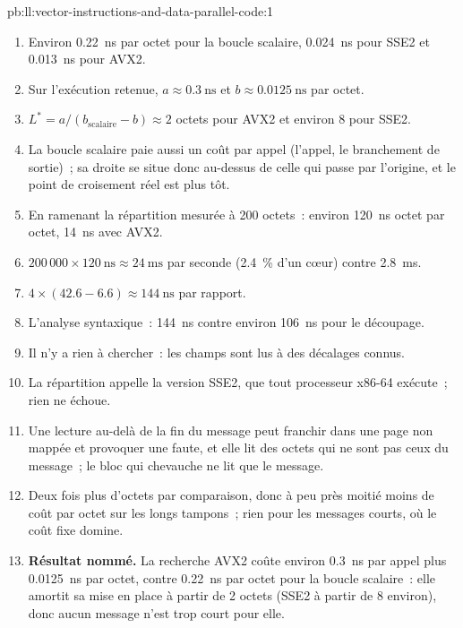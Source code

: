 \begin{solution}{pb:ll:vector-instructions-and-data-parallel-code:1}
\begin{enumerate}
\item Environ \qty{0.22}{\nano\second} par octet pour la boucle scalaire, \qty{0.024}{\nano\second} pour SSE2 et \qty{0.013}{\nano\second}
pour AVX2.
\item Sur l'exécution retenue, $a \approx \qty{0.3}{\nano\second}$ et $b \approx \qty{0.0125}{\nano\second}$ par octet.
\item $L^* = a/(b_{\text{scalaire}} - b) \approx 2$ octets pour AVX2 et environ 8 pour SSE2.
\item La boucle scalaire paie aussi un coût par appel (l'appel, le branchement de sortie)~; sa droite se situe donc au-dessus de celle qui passe par l'origine,
et le point de croisement réel est plus tôt.
\item En ramenant la répartition mesurée à 200 octets~: environ \qty{120}{\nano\second} octet par octet, \qty{14}{\nano\second} avec AVX2.
\item $200\,000 \times \qty{120}{\nano\second} \approx \qty{24}{\milli\second}$ par seconde (2.4~\% d'un cœur) contre
\qty{2.8}{\milli\second}.
\item $4 \times (42.6 - 6.6) \approx \qty{144}{\nano\second}$ par rapport.
\item L'analyse syntaxique~: \qty{144}{\nano\second} contre environ \qty{106}{\nano\second} pour le découpage.
\item Il n'y a rien à chercher~: les champs sont lus à des décalages connus.
\item La répartition appelle la version SSE2, que tout processeur x86-64 exécute~; rien ne échoue.
\item Une lecture au-delà de la fin du message peut franchir dans une page non mappée et provoquer une faute, et elle lit des octets qui ne sont pas ceux
du message~; le bloc qui chevauche ne lit que le message.
\item Deux fois plus d'octets par comparaison, donc à peu près moitié moins de coût par octet sur les longs tampons~; rien pour les messages courts, où le
coût fixe domine.
\item \textbf{Résultat nommé.} La recherche AVX2 coûte environ \qty{0.3}{\nano\second} par appel plus \qty{0.0125}{\nano\second} par
octet, contre \qty{0.22}{\nano\second} par octet pour la boucle scalaire~: elle amortit sa mise en place à partir de 2 octets (SSE2 à partir de
8 environ), donc aucun message n'est trop court pour elle.

\end{enumerate}
\end{solution}
